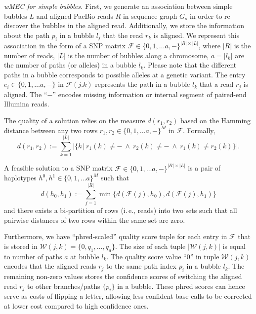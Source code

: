 
\textit{wMEC for simple bubbles.} First, we generate an association between simple bubbles $L$ and aligned PacBio reads $R$ in sequence graph $G_s$ in order to re-discover the bubbles in the aligned read. Additionally, we store the information about the path $p_i$ in a bubble $l_j$ that the read $r_k$ is aligned.
We represent this association in the form of a  SNP matrix $\mathcal{F}\in\{0,1, \ldots a, -\}^{|R|\times |L|}$, where $|R|$ is the number of reads, $|L|$ is the number of bubbles along a chromosome, $a = |l_k|$ are the number of paths (or alleles) in a bubble $l_k$.
Please note that the different paths in a bubble corresponds to possible alleles at a genetic variant. The entry $e_i \in \{0,1, \ldots a, -\}$ in $\mathcal{F}(j.k)$ represents the path in a bubble $l_k$ that a read $r_j$ is aligned. The ``$-$'' encodes missing information or internal segment of paired-end Illumina reads.

\begin{definition}[Distance] 
The quality of a solution relies on the measure $d(r_1,r_2)$ based on the Hamming distance between any two rows $r_1,r_2\in\{0,1, \ldots a, -\}^M$ in $\mathcal{F}$. Formally,
\[d(r_1,r_2):=\sum_{k=1}^{|L|} \big|\big\{k\,\big|\,r_1(k)\neq -\ \wedge\ r_2(k)\neq -\ \wedge\ r_1(k)\neq r_2(k)\big\}\big|.\]
\end{definition}

\begin{definition}[Feasibility]
A feasible solution to a SNP matrix $\mathcal{F}\in\{0,1, \ldots a, -\}^{|R|\times |L|}$ is a pair of haplotypes $h^0,h^1\in\{0,1, \ldots a\}^M$ such that 
\[d(h_0,h_1):=\sum_{j=1}^{|R|} \min\{ d(\mathcal{F}(j), h_0), d(\mathcal{F}(j), h_1)\} \]
and there exists a bi-partition of rows (i.\,e., reads) into two sets such that all pairwise distances of two rows within the same set are zero.
\end{definition}

Furthermore, we have ``phred-scaled'' quality score tuple for each entry in $\mathcal{F}$ that is stored in $\mathcal{W}(j,k) = \{0, q_1, \ldots, q_a\}$. The size of each tuple $|\mathcal{W}(j,k)|$ is equal to number of paths $a$ at bubble $l_k$.
The quality score value ``0'' in tuple $\mathcal{W}(j,k)$ encodes that the aligned reads $r_j$ to the same path index $p_i$ in a bubble $l_k$. The remaining non-zero values stores the confidence scores of switching the aligned read $r_j$ to other branches/paths $\{p_i\}$ in a bubble.
These phred scores can hence serve as costs of flipping a letter, allowing less confident base calls to be corrected at lower cost compared to high confidence ones.

